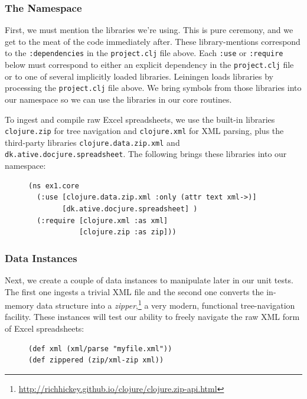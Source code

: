 \documentclass[11pt]{article}
\begin{document}
\subsubsection{The Namespace}
\label{sec-2-3-1}
First, we must mention the libraries we're using. This is pure
ceremony, and we get to the meat of the code immediately after. These
library-mentions correspond to the \verb|:dependencies| in the
\verb|project.clj| file above. Each \verb|:use| or \verb|:require|
below must correspond to either an explicit dependency in the
\verb|project.clj| file or to one of several implicitly loaded
libraries. Leiningen loads libraries by processing the
\verb|project.clj| file above. We bring symbols from those libraries
into our namespace so we can use the libraries in our core routines.

To ingest and compile raw Excel spreadsheets, we use the built-in
libraries \verb|clojure.zip| for tree navigation and
\verb|clojure.xml| for XML parsing, plus the third-party libraries
\verb|clojure.data.zip.xml| and \verb|dk.ative.docjure.spreadsheet|.
The following brings these libraries into our namespace:
\begin{figure}[H]
\label{main-namespace}
\begin{verbatim}
(ns ex1.core
  (:use [clojure.data.zip.xml :only (attr text xml->)]
        [dk.ative.docjure.spreadsheet] ) 
  (:require [clojure.xml :as xml]
            [clojure.zip :as zip]))
\end{verbatim}
\end{figure}
\subsubsection{Data Instances}
\label{sec-2-3-2}
Next, we create a couple of data instances to manipulate later in our
unit tests. The first one ingests a trivial XML file and the second
one converts the in-memory data structure into a
\emph{zipper},\footnote{\url{http://richhickey.github.io/clojure/clojure.zip-api.html}}
a very modern, functional tree-navigation facility. These instances
will test our ability to freely navigate the raw XML form of Excel
spreadsheets:
\begin{figure}[H]
\label{main-zippered}
\begin{verbatim}
(def xml (xml/parse "myfile.xml"))
(def zippered (zip/xml-zip xml))
\end{verbatim}
\end{figure}
\end{document}

